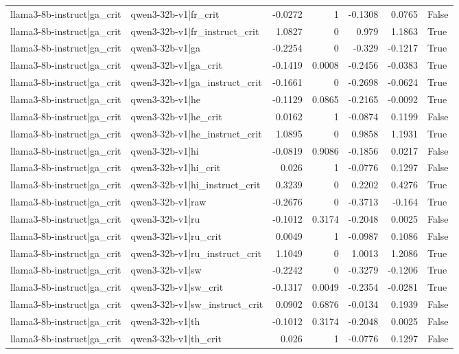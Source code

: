 \begin{table}
\begin{tabular}{l l r r r r l}
llama3-8b-instruct|ga_crit & qwen3-32b-v1|fr_crit & -0.0272 & 1 & -0.1308 & 0.0765 & False \\
llama3-8b-instruct|ga_crit & qwen3-32b-v1|fr_instruct_crit & 1.0827 & 0 & 0.979 & 1.1863 & True \\
llama3-8b-instruct|ga_crit & qwen3-32b-v1|ga & -0.2254 & 0 & -0.329 & -0.1217 & True \\
llama3-8b-instruct|ga_crit & qwen3-32b-v1|ga_crit & -0.1419 & 0.0008 & -0.2456 & -0.0383 & True \\
llama3-8b-instruct|ga_crit & qwen3-32b-v1|ga_instruct_crit & -0.1661 & 0 & -0.2698 & -0.0624 & True \\
llama3-8b-instruct|ga_crit & qwen3-32b-v1|he & -0.1129 & 0.0865 & -0.2165 & -0.0092 & True \\
llama3-8b-instruct|ga_crit & qwen3-32b-v1|he_crit & 0.0162 & 1 & -0.0874 & 0.1199 & False \\
llama3-8b-instruct|ga_crit & qwen3-32b-v1|he_instruct_crit & 1.0895 & 0 & 0.9858 & 1.1931 & True \\
llama3-8b-instruct|ga_crit & qwen3-32b-v1|hi & -0.0819 & 0.9086 & -0.1856 & 0.0217 & False \\
llama3-8b-instruct|ga_crit & qwen3-32b-v1|hi_crit & 0.026 & 1 & -0.0776 & 0.1297 & False \\
llama3-8b-instruct|ga_crit & qwen3-32b-v1|hi_instruct_crit & 0.3239 & 0 & 0.2202 & 0.4276 & True \\
llama3-8b-instruct|ga_crit & qwen3-32b-v1|raw & -0.2676 & 0 & -0.3713 & -0.164 & True \\
llama3-8b-instruct|ga_crit & qwen3-32b-v1|ru & -0.1012 & 0.3174 & -0.2048 & 0.0025 & False \\
llama3-8b-instruct|ga_crit & qwen3-32b-v1|ru_crit & 0.0049 & 1 & -0.0987 & 0.1086 & False \\
llama3-8b-instruct|ga_crit & qwen3-32b-v1|ru_instruct_crit & 1.1049 & 0 & 1.0013 & 1.2086 & True \\
llama3-8b-instruct|ga_crit & qwen3-32b-v1|sw & -0.2242 & 0 & -0.3279 & -0.1206 & True \\
llama3-8b-instruct|ga_crit & qwen3-32b-v1|sw_crit & -0.1317 & 0.0049 & -0.2354 & -0.0281 & True \\
llama3-8b-instruct|ga_crit & qwen3-32b-v1|sw_instruct_crit & 0.0902 & 0.6876 & -0.0134 & 0.1939 & False \\
llama3-8b-instruct|ga_crit & qwen3-32b-v1|th & -0.1012 & 0.3174 & -0.2048 & 0.0025 & False \\
llama3-8b-instruct|ga_crit & qwen3-32b-v1|th_crit & 0.026 & 1 & -0.0776 & 0.1297 & False \\

\end{tabular}
\end{table}
